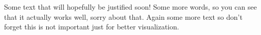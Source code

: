 \documentclass[preview]{standalone}
\begin{document}
\begin{justify}
Some text that will hopefully be justified soon! Some more words, so you can see that it actually works well, sorry about that. Again some more text so don't forget this is not important just for better visualization.
\end{justify}
\end{document}
